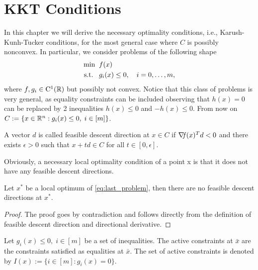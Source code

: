 \documentclass[10pt,a4paper]{article}
\begin{document}
\section{KKT Conditions}
In this chapter we will derive the necessary optimality conditions, i.e., Karush-Kunh-Tucker conditions, for the most general case where $C$ is possibly nonconvex. In particular, we consider problems of the following shape
\begin{equation}\label{eq:last_problem}
\begin{split}
\min \;\; &f(x)\\
\text{s.t.} \;\;\;& g_i(x)\leq 0, \quad i=0, \dots, m,
\end{split}
\end{equation}
where $f,g_i\in \mathord{\mathrm{C^1}}(\mathbb{R})$ but possibly not convex. Notice that this class of problems is very general, as equality constraints can be included observing that $h(x)=0$ can be replaced by 2 inequalities $h(x)\leq0$ and $-h(x)\leq 0$. From now on $C:=\{x\in\mathbb{R}^n: g_i(x)\leq 0, \; i\in [m] \}$. 
\begin{definition} A vector $d$ is called feasible descent direction at $x\in C$ if $\operatorname*{\mathit{\nabla \!f}}(x)^Td<0$ and there exists $\epsilon>0$ such that $x+td\in C$ for all $t\in [0,\epsilon].$

\end{definition}
Obviously, a necessary local optimality condition of a point x is that it does not have
any feasible descent directions.
\begin{lemma} Let $x^*$ be a local optimum of \eqref{eq:last_problem}, then there are no feasible descent directions at $x^*.$
\end{lemma}
\begin{proof}
The proof goes by contradiction and follows directly from the definition of feasible descent direction and directional derivative.
\end{proof}
\begin{definition} Let $g_i(x)\leq 0, \; i\in [m] $ be a set of inequalities. The active constraints at $\bar{x}$ are the constraints satisfied as equalities at $\bar{x}$. The set of active constraints is denoted by $I(x):=\{i\in[m]: g_i(x)=0\}.$
\end{definition}
\end{document}
